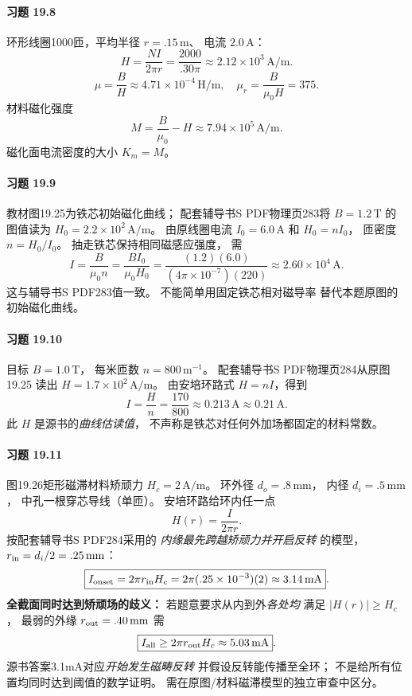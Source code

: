 \paragraph{习题 19.8}
环形线圈1000匝，平均半径 \(r=.15\,\mathrm m\)、
电流 \(2.0\,\mathrm A\)：
\[
 \boxed{H=\frac{NI}{2\pi r}
 =\frac{2000}{.30\pi}
 \approx2.12\times10^3\,\mathrm{A/m}}.
\]
\[
 \boxed{\mu=\frac BH
 \approx4.71\times10^{-4}\,\mathrm{H/m}},\quad
 \boxed{\mu_r=\frac B{\mu_0H}=375}.
\]
材料磁化强度
\[
 \boxed{M=\frac B{\mu_0}-H
 \approx7.94\times10^5\,\mathrm{A/m}}.
\]
磁化面电流密度的大小
\(\boxed{K_m=M}\)。

\paragraph{习题 19.9}
教材图19.25为铁芯初始磁化曲线；
配套辅导书S PDF物理页283将
\(B=1.2\,\mathrm T\) 的图值读为
\(H_0=2.2\times10^2\,\mathrm{A/m}\)。
由原线圈电流 \(I_0=6.0\,\mathrm A\)
和 \(H_0=nI_0\)，
匝密度 \(n=H_0/I_0\)。
抽走铁芯保持相同磁感应强度，
需
\[
 \boxed{I=\frac{B}{\mu_0 n}
 =\frac{BI_0}{\mu_0H_0}
 =\frac{(1.2)(6.0)}
 {(4\pi\times10^{-7})(220)}
 \approx2.60\times10^4\,\mathrm A}.
\]
这与辅导书S PDF283值一致。
不能简单用固定铁芯相对磁导率
替代本题原图的初始磁化曲线。

\paragraph{习题 19.10}
目标 \(B=1.0\,\mathrm T\)，
每米匝数 \(n=800\,\mathrm{m^{-1}}\)。
配套辅导书S PDF物理页284从原图19.25
读出 \(H=1.7\times10^2\,\mathrm{A/m}\)。
由安培环路式
\(H=nI\)，得到
\[
 \boxed{I=\frac Hn
 =\frac{170}{800}
 \approx0.213\,\mathrm A\approx0.21\,\mathrm A}.
\]
此 \(H\) 是源书的\emph{曲线估读值}，
不声称是铁芯对任何外加场都固定的材料常数。

\paragraph{习题 19.11}
图19.26矩形磁滞材料矫顽力
\(H_c=2\,\mathrm{A/m}\)。
环外径 \(d_o=.8\,\mathrm{mm}\)，
内径 \(d_i=.5\,\mathrm{mm}\)，
中孔一根穿芯导线（单匝）。
安培环路给环内任一点
\[
 H(r)=\frac{I}{2\pi r}.
\]
按配套辅导书S PDF284采用的
\emph{内缘最先跨越矫顽力并开启反转}
的模型，\(r_{\rm in}=d_i/2=.25\,\mathrm{mm}\)：
\[
 \boxed{I_{\rm onset}=2\pi r_{\rm in}H_c
 =2\pi(.25\times10^{-3})(2)
 \approx3.14\,\mathrm{mA}}.
\]
\textbf{全截面同时达到矫顽场的歧义：}
若题意要求从内到外\emph{各处均}
满足 \(|H(r)|\ge H_c\)，
最弱的外缘 \(r_{\rm out}=.40\,\mathrm{mm}\)
需
\[
 \boxed{I_{\rm all}\ge2\pi r_{\rm out}H_c
 \approx5.03\,\mathrm{mA}}.
\]
源书答案3.1mA对应\emph{开始发生磁畴反转}
并假设反转能传播至全环；
不是给所有位置均同时达到阈值的数学证明。
需在原图/材料磁滞模型的独立审查中区分。

